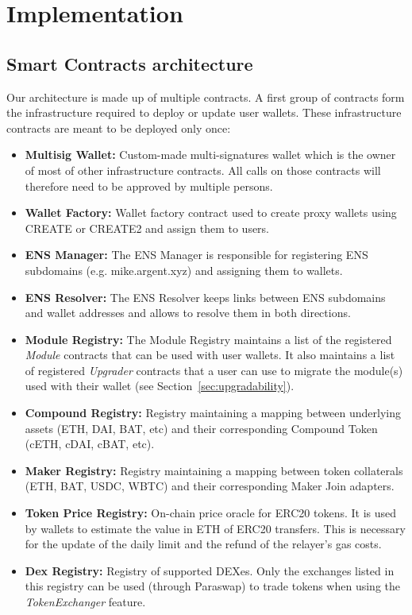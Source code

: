 \documentclass[12pt]{article}
\begin{document}
\section{Implementation}

\subsection{Smart Contracts architecture}


Our architecture is made up of multiple contracts. A first group of contracts form the infrastructure required to deploy or update user wallets. These infrastructure contracts are meant to be deployed only once:
\begin{itemize}
    \item \textbf{Multisig Wallet:} Custom-made multi-signatures wallet which is the owner of most of other infrastructure contracts. All calls on those contracts will therefore need to be approved by multiple persons.
    \item \textbf{Wallet Factory:} Wallet factory contract used to create proxy wallets using CREATE or CREATE2 and assign them to users.
    \item \textbf{ENS Manager:} The ENS Manager is responsible for registering ENS subdomains (e.g. mike.argent.xyz) and assigning them to wallets.
    \item \textbf{ENS Resolver:} The ENS Resolver keeps links between ENS subdomains and wallet addresses and allows to resolve them in both directions.
    \item \textbf{Module Registry:} The Module Registry maintains a list of the registered \emph{Module} contracts that can be used with user wallets. It also maintains a list of registered \emph{Upgrader} contracts that a user can use to migrate the module(s) used with their wallet (see Section~\ref{sec:upgradability}).
    \item \textbf{Compound Registry:} Registry maintaining a mapping between underlying assets (ETH, DAI, BAT, etc) and their corresponding Compound Token (cETH, cDAI, cBAT, etc).
    \item \textbf{Maker Registry:} Registry maintaining a mapping between token collaterals (ETH, BAT, USDC, WBTC) and their corresponding Maker Join adapters.
    \item \textbf{Token Price Registry:} On-chain price oracle for ERC20 tokens. It is used by wallets to estimate the value in ETH of ERC20 transfers. This is necessary for the update of the daily limit and the refund of the relayer's gas costs. 
    \item \textbf{Dex Registry:} Registry of supported DEXes. Only the exchanges listed in this registry can be used (through Paraswap) to trade tokens when using the \emph{TokenExchanger} feature.
\end{itemize}
\end{document}
